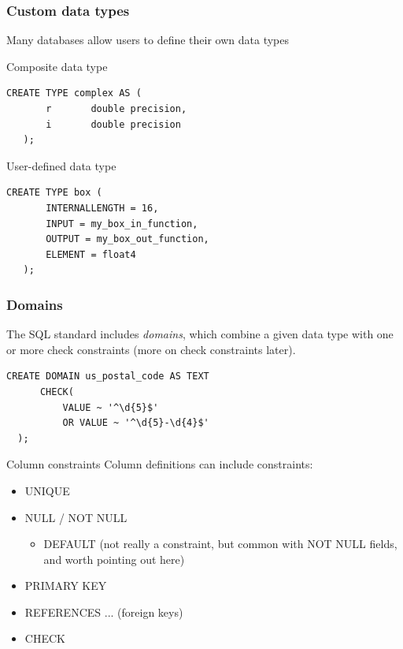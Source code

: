 \documentclass{beamer}
\begin{document}
\begin{frame}[fragile]
    \frametitle{Custom data types}
    Many databases allow users to define their own data types
    \begin{block}{Composite data type}
    \vspace{2px}
    \begin{Verbatim}[fontfamily=courier]
   CREATE TYPE complex AS (
       r       double precision,
       i       double precision
   );
    \end{Verbatim}
    \vspace{2px}
    \end{block}
    \begin{block}{User-defined data type}
    \vspace{2px}
    \begin{Verbatim}[fontfamily=courier]
   CREATE TYPE box (
       INTERNALLENGTH = 16,
       INPUT = my_box_in_function,
       OUTPUT = my_box_out_function,
       ELEMENT = float4
   );
    \end{Verbatim}
    \vspace{2px}
    \end{block}
\end{frame}

\begin{frame}[fragile]
    \frametitle{Domains}
    The SQL standard includes \emph{domains}, which combine a given data type
    with one or more check constraints (more on check constraints later).
    \begin{Verbatim}[fontfamily=courier]
  CREATE DOMAIN us_postal_code AS TEXT
      CHECK(
          VALUE ~ '^\d{5}$'
          OR VALUE ~ '^\d{5}-\d{4}$'
  );
    \end{Verbatim}
\end{frame}

\begin{frame}{Column constraints}
    Column definitions can include constraints:
    \begin{itemize}
        \item UNIQUE
        \item NULL / NOT NULL
        \begin{itemize}
            \item DEFAULT (not really a constraint, but common with NOT NULL fields, and worth pointing out here)
        \end{itemize}
        \item PRIMARY KEY
        \item REFERENCES ... (foreign keys)
        \item CHECK
    \end{itemize}
\end{frame}
\end{document}
